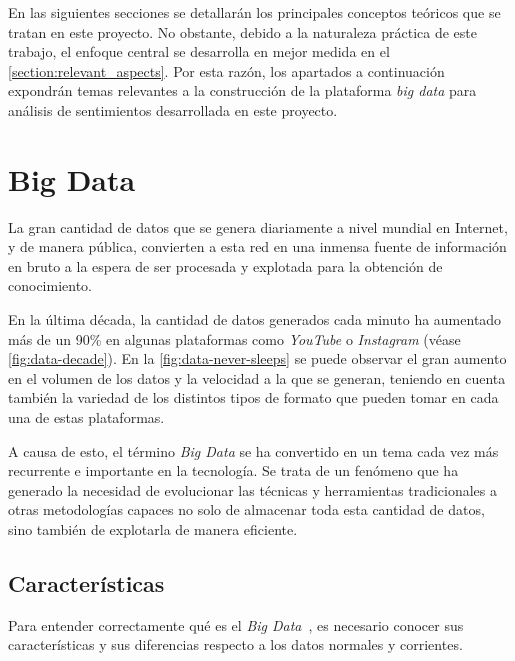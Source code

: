 
En las siguientes secciones se detallarán los principales conceptos teóricos que se tratan en este proyecto. No obstante, debido a la naturaleza práctica de este trabajo, el enfoque central se desarrolla en mejor medida en el \autoref{section:relevant_aspects}. Por esta razón, los apartados a continuación expondrán temas relevantes a la construcción de la plataforma \textit{big data} para análisis de sentimientos desarrollada en este proyecto.

\section{Big Data}

La gran cantidad de datos que se genera diariamente a nivel mundial en Internet, y de manera pública, convierten a esta red en una inmensa fuente de información en bruto a la espera de ser procesada y explotada para la obtención de conocimiento.

En la última década, la cantidad de datos generados cada minuto ha aumentado más de un 90\% en algunas plataformas como \textit{YouTube} o \textit{Instagram} (véase \autoref{fig:data-decade}). En la \autoref{fig:data-never-sleeps} se puede observar el gran aumento en el volumen de los datos y la velocidad a la que se generan, teniendo en cuenta también la variedad de los distintos tipos de formato que pueden tomar en cada una de estas plataformas. 



A causa de esto, el término \textit{Big Data} se ha convertido en un tema cada vez más recurrente e importante en la tecnología. Se trata de un fenómeno que ha generado la necesidad de evolucionar las técnicas y herramientas tradicionales a otras metodologías capaces no solo de almacenar toda esta cantidad de datos, sino también de explotarla de manera eficiente.

\subsection{Características}

Para entender correctamente qué es el \textit{Big Data}~\cite{oracleData}, es necesario conocer sus características y sus diferencias respecto a los datos normales y corrientes.

